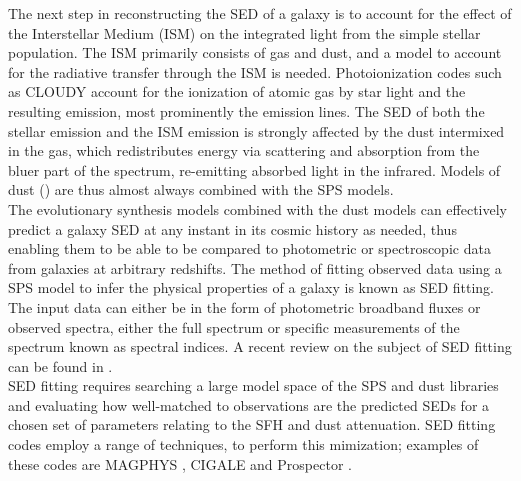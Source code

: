 The next step in reconstructing the SED of a galaxy is to account for
the effect of the Interstellar Medium (ISM) on the integrated light
from the simple stellar population. The ISM primarily consists of gas
and dust, and a model to account for the radiative transfer through
the ISM is needed. Photoionization codes such as CLOUDY
\citep{2013RMxAA..49..137F} account for the ionization of atomic gas
by star light and the resulting emission, most prominently the
emission lines. The SED of both the stellar emission and the ISM
emission is strongly affected by the dust intermixed in the gas, which
redistributes energy via scattering and absorption from the bluer part
of the spectrum, re-emitting absorbed light in the infrared. Models of
dust (\citealt{calzetti_calibration_2007, 2007ApJ...657..810D}) are
thus almost always combined with the SPS models.\\

The evolutionary synthesis models combined with the dust models can
effectively predict a galaxy SED at any instant in its cosmic history
as needed, thus enabling them to be able to be compared to photometric
or spectroscopic data from galaxies at arbitrary redshifts. The method
of fitting observed data using a SPS model to infer the physical
properties of a galaxy is known as SED fitting. The input data can
either be in the form of photometric broadband fluxes or observed
spectra, either the full spectrum or specific measurements of the
spectrum known as spectral indices. A recent review on the subject of
SED fitting can be found in \citet{conroy_modeling_2013}.\\

SED fitting requires searching a large model space of the SPS 
and dust libraries and evaluating how well-matched to observations
are the predicted SEDs for  a chosen  set of parameters relating 
to the SFH and dust attenuation. SED fitting codes
employ a range of techniques, to perform this 
mimization; examples of these codes are  MAGPHYS 
\citep{da_cunha_simple_2008}, CIGALE \citep{noll_2009} and 
Prospector \citep{2017ApJ...837..170L}.\\


